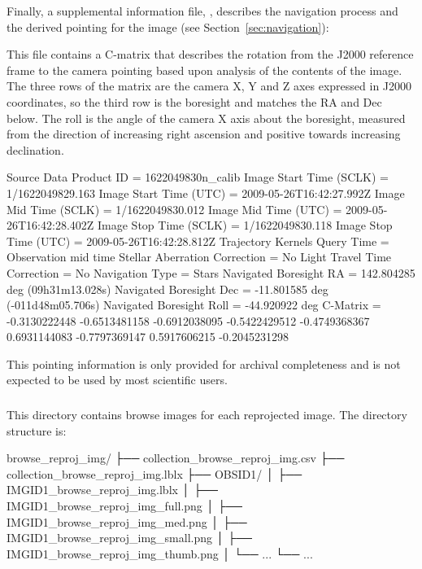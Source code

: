Finally, a supplemental information file, , describes the navigation process and the derived pointing for the image (see Section~\ref{sec:navigation}):

\begin{CodeBlock}[fontsize=\scriptsize]
This file contains a C-matrix that describes the rotation from the J2000 reference
frame to the camera pointing based upon analysis of the contents of the image.
The three rows of the matrix are the camera X, Y and Z axes expressed in J2000
coordinates, so the third row is the boresight and matches the RA and Dec below.
The roll is the angle of the camera X axis about the boresight, measured from the
direction of increasing right ascension and positive towards increasing
declination.

Source Data Product ID = 1622049830n_calib
Image Start Time (SCLK) = 1/1622049829.163
Image Start Time (UTC) = 2009-05-26T16:42:27.992Z
Image Mid Time (SCLK) = 1/1622049830.012
Image Mid Time (UTC) = 2009-05-26T16:42:28.402Z
Image Stop Time (SCLK) = 1/1622049830.118
Image Stop Time (UTC) = 2009-05-26T16:42:28.812Z
Trajectory Kernels Query Time = Observation mid time
Stellar Aberration Correction = No
Light Travel Time Correction = No
Navigation Type = Stars
Navigated Boresight RA = 142.804285 deg (09h31m13.028s)
Navigated Boresight Dec = -11.801585 deg (-011d48m05.706s)
Navigated Boresight Roll = -44.920922 deg
C-Matrix =
   -0.3130222448   -0.6513481158   -0.6912038095
   -0.5422429512   -0.4749368367    0.6931144083
   -0.7797369147    0.5917606215   -0.2045231298
\end{CodeBlock}

This pointing information is only provided for archival completeness and is not expected to be used by most scientific users.


\subsubsection{}
\label{sec:browse-reproj-img}

This directory contains browse images for each reprojected image. The directory structure is:

\begin{CodeBlock}
browse_reproj_img/
├── collection_browse_reproj_img.csv
├── collection_browse_reproj_img.lblx
├── OBSID1/
│   ├── IMGID1_browse_reproj_img.lblx
│   ├── IMGID1_browse_reproj_img_full.png
│   ├── IMGID1_browse_reproj_img_med.png
│   ├── IMGID1_browse_reproj_img_small.png
│   ├── IMGID1_browse_reproj_img_thumb.png
│   └── ...
└── ...
\end{CodeBlock}

